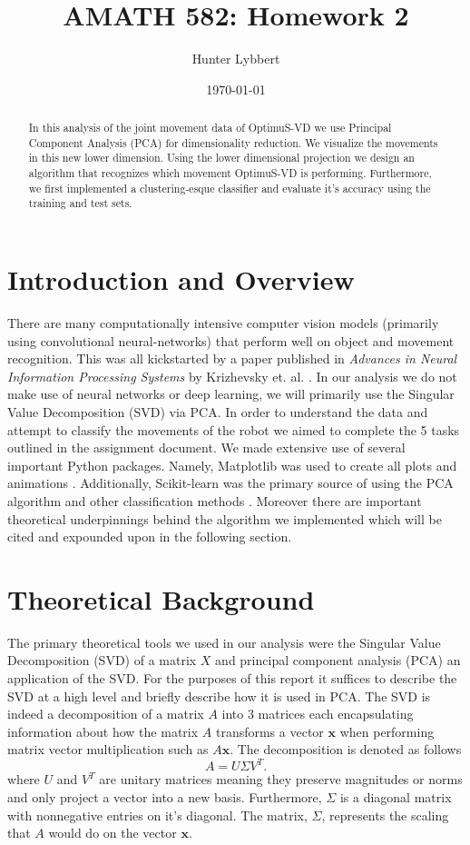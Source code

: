 \documentclass[11pt]{amsart}
\title{AMATH 582: Homework 2}
\author{Hunter Lybbert} %
\date{\today} %
\begin{document}
\maketitle

\begin{abstract}
    In this analysis of the joint movement data of OptimuS-VD we use Principal Component Analysis (PCA) for dimensionality reduction.
    We visualize the movements in this new lower dimension.
    Using the lower dimensional projection we design an algorithm that recognizes which movement OptimuS-VD is performing.
    Furthermore, we first implemented a clustering-esque classifier and evaluate it's accuracy using the training and test sets.
\end{abstract}

\section{Introduction and Overview}\label{sec:Introduction}
There are many computationally intensive computer vision models (primarily using convolutional neural-networks) that perform well on object and movement recognition.
This was all kickstarted by a paper published in \textit{Advances in Neural Information Processing Systems} by Krizhevsky et. al.  \cite{NIPS2012_c399862d}.
In our analysis we do not make use of neural networks or deep learning, we will primarily use the Singular Value Decomposition (SVD) via PCA.
In order to understand the data and attempt to classify the movements of the robot we aimed to complete the 5 tasks outlined in the assignment document.
We made extensive use of several important Python packages.
Namely, Matplotlib was used to create all plots and animations \cite{Hunter:2007}.
Additionally, Scikit-learn was the primary source of using the PCA algorithm and other classification methods \cite{scikit-learn}. 
Moreover there are important theoretical underpinnings behind the algorithm we implemented which will be cited and expounded upon in the following section.

\section{Theoretical Background}\label{sec:theory}
The primary theoretical tools we used in our analysis were the Singular Value Decomposition (SVD) of a matrix $X$ and principal component analysis (PCA) an application of the SVD.
For the purposes of this report it suffices to describe the SVD at a high level and briefly describe how it is used in PCA.
The SVD is indeed a decomposition of a matrix $A$ into 3 matrices each encapsulating information about how the matrix $A$ transforms a vector $\bm x$ when performing matrix vector multiplication such as $A \bm x$.
The decomposition is denoted as follows
\begin{equation}
A = U\Sigma V^T.
\label{eq:svd}
\end{equation}
where $U$ and $V^T$ are unitary matrices meaning they preserve magnitudes or norms and only project a vector into a new basis.
Furthermore, $\Sigma$ is a diagonal matrix with nonnegative entries on it's diagonal.
The matrix, $\Sigma$, represents the scaling that $A$ would do on the vector $\bm x$.
\end{document}
